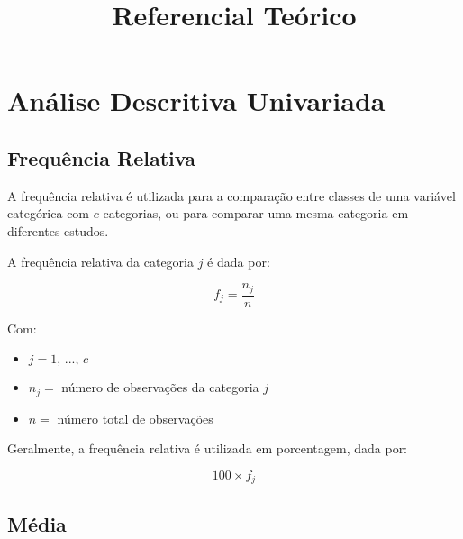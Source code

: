 \documentclass[
  portuguese,
]{estat/estat}
\title{Referencial Teórico}
\author{}
\date{}
\let\oldsection\section
\renewcommand\section{\clearpage\oldsection}
\renewcommand*\contentsname{Índice}
\newcommand\contentsname{Índice}
\begin{document}
\maketitle

\fancyhf{} 

\fancyhead[L]{} %
\renewcommand{\headrulewidth}{0pt}   %

\fancyfoot[R]{\textcolor{white}{\thepage}} %

\pagestyle{fancy} 



\renewcommand*\contentsname{Sumário}
{
\hypersetup{linkcolor=}
\setcounter{tocdepth}{3}
\tableofcontents
}

\section{Análise Descritiva
Univariada}\label{anuxe1lise-descritiva-univariada}

\subsection{Frequência Relativa}\label{frequuxeancia-relativa}

A frequência relativa é utilizada para a comparação entre classes de uma
variável categórica com \(c\) categorias, ou para comparar uma mesma
categoria em diferentes estudos.

A frequência relativa da categoria \(j\) é dada por:

\[
f_j=\frac{n_j}{n}
\]

Com:

\begin{itemize}
\item
  \(j = 1, \, ..., \, c\)
\item
  \(n_j =\) número de observações da categoria \(j\)
\item
  \(n =\) número total de observações
\end{itemize}

Geralmente, a frequência relativa é utilizada em porcentagem, dada por:

\[100 \times f_j\]

\subsection{Média}\label{muxe9dia}
\end{document}
